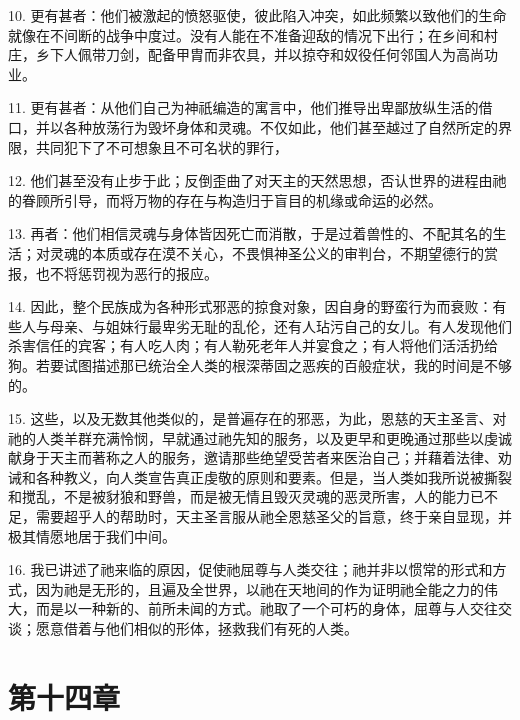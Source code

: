 10. 更有甚者：他们被激起的愤怒驱使，彼此陷入冲突，如此频繁以致他们的生命就像在不间断的战争中度过。没有人能在不准备迎敌的情况下出行；在乡间和村庄，乡下人佩带刀剑，配备甲胄而非农具，并以掠夺和奴役任何邻国人为高尚功业。\par

11. 更有甚者：从他们自己为神祇编造的寓言中，他们推导出卑鄙放纵生活的借口，并以各种放荡行为毁坏身体和灵魂。不仅如此，他们甚至越过了自然所定的界限，共同犯下了不可想象且不可名状的罪行，\par

12. 他们甚至没有止步于此；反倒歪曲了对天主的天然思想，否认世界的进程由祂的眷顾所引导，而将万物的存在与构造归于盲目的机缘或命运的必然。\par

13. 再者：他们相信灵魂与身体皆因死亡而消散，于是过着兽性的、不配其名的生活；对灵魂的本质或存在漠不关心，不畏惧神圣公义的审判台，不期望德行的赏报，也不将惩罚视为恶行的报应。\par

14. 因此，整个民族成为各种形式邪恶的掠食对象，因自身的野蛮行为而衰败：有些人与母亲、与姐妹行最卑劣无耻的乱伦，还有人玷污自己的女儿。有人发现他们杀害信任的宾客；有人吃人肉；有人勒死老年人并宴食之；有人将他们活活扔给狗。若要试图描述那已统治全人类的根深蒂固之恶疾的百般症状，我的时间是不够的。\par

15. 这些，以及无数其他类似的，是普遍存在的邪恶，为此，恩慈的天主圣言、对祂的人类羊群充满怜悯，早就通过祂先知的服务，以及更早和更晚通过那些以虔诚献身于天主而著称之人的服务，邀请那些绝望受苦者来医治自己；并藉着法律、劝诫和各种教义，向人类宣告真正虔敬的原则和要素。但是，当人类如我所说被撕裂和搅乱，不是被豺狼和野兽，而是被无情且毁灭灵魂的恶灵所害，人的能力已不足，需要超乎人的帮助时，天主圣言服从祂全恩慈圣父的旨意，终于亲自显现，并极其情愿地居于我们中间。\par

16. 我已讲述了祂来临的原因，促使祂屈尊与人类交往；祂并非以惯常的形式和方式，因为祂是无形的，且遍及全世界，以祂在天地间的作为证明祂全能之力的伟大，而是以一种新的、前所未闻的方式。祂取了一个可朽的身体，屈尊与人交往交谈；愿意借着与他们相似的形体，拯救我们有死的人类。\par


\section{第十四章}


